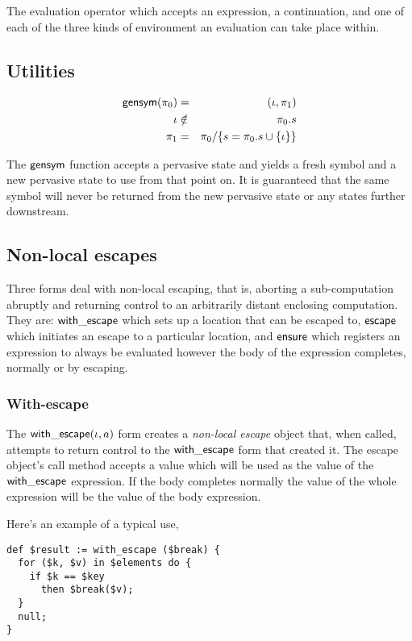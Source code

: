 \documentclass{article}
\begin{document}
The evaluation operator which accepts an expression, a continuation, and one of
each of the three kinds of environment an evaluation can take place within.

\subsection{Utilities}

\begin{eqnarray*}
\mathsf{gensym}(\pi_0) & = & (\iota, \pi_1) \\
\iota & \notin & \pi_0.s \\
\pi_1 & = & \pi_0 / \{ s = \pi_0.s \cup \{ \iota \} \}
\end{eqnarray*}

The $\mathsf{gensym}$ function accepts a pervasive state and yields a fresh symbol
and a new pervasive state to use from that point on. It is guaranteed that the
same symbol will never be returned from the new pervasive state or any states
further downstream.

\subsection{Non-local escapes}

Three forms deal with non-local escaping, that is, aborting a sub-computation
abruptly and returning control to an arbitrarily distant enclosing computation.
They are: $\mathsf{with\_escape}$ which sets up a location that can be escaped to,
$\mathsf{escape}$ which initiates an escape to a particular location, and
$\mathsf{ensure}$ which registers an expression to always be evaluated however
the body of the expression completes, normally or by escaping.

\subsubsection{With-escape}

The $\mathsf{with\_escape}(\iota, a) $ form creates a \emph{non-local escape} object
that, when called, attempts to return control to the $\mathsf{with\_escape}$ form
that created it. The escape object's call method accepts a value which will be
used as the value of the $\mathsf{with\_escape}$ expression. If the body completes
normally the value of the whole expression will be the value of the body expression.

Here's an example of a typical use,

\begin{verbatim}
def $result := with_escape ($break) {
  for ($k, $v) in $elements do {
    if $k == $key
      then $break($v);
  }
  null;
}
\end{verbatim}
\end{document}
